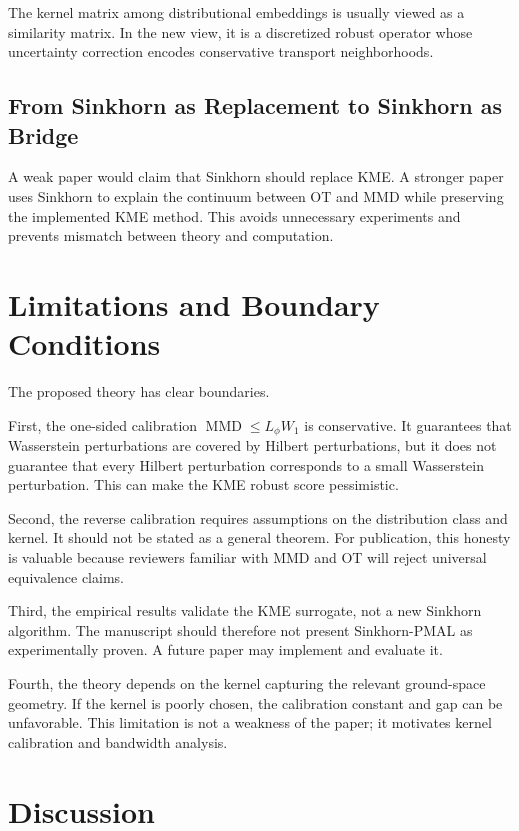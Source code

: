 \documentclass[10pt,journal]{IEEEtran}
\DeclareMathOperator{\MMD}{MMD}
\begin{document}
The kernel matrix among distributional embeddings is usually viewed as a similarity matrix. In the new view, it is a discretized robust operator whose uncertainty correction encodes conservative transport neighborhoods.

\subsection{From Sinkhorn as Replacement to Sinkhorn as Bridge}

A weak paper would claim that Sinkhorn should replace KME. A stronger paper uses Sinkhorn to explain the continuum between OT and MMD while preserving the implemented KME method. This avoids unnecessary experiments and prevents mismatch between theory and computation.

\section{Limitations and Boundary Conditions}
\label{sec:limitations}

The proposed theory has clear boundaries.

First, the one-sided calibration $\MMD\le L_\phi W_1$ is conservative. It guarantees that Wasserstein perturbations are covered by Hilbert perturbations, but it does not guarantee that every Hilbert perturbation corresponds to a small Wasserstein perturbation. This can make the KME robust score pessimistic.

Second, the reverse calibration requires assumptions on the distribution class and kernel. It should not be stated as a general theorem. For publication, this honesty is valuable because reviewers familiar with MMD and OT will reject universal equivalence claims.

Third, the empirical results validate the KME surrogate, not a new Sinkhorn algorithm. The manuscript should therefore not present Sinkhorn-PMAL as experimentally proven. A future paper may implement and evaluate it.

Fourth, the theory depends on the kernel capturing the relevant ground-space geometry. If the kernel is poorly chosen, the calibration constant and gap can be unfavorable. This limitation is not a weakness of the paper; it motivates kernel calibration and bandwidth analysis.


\section{Discussion}
\label{sec:discussion}
\end{document}
